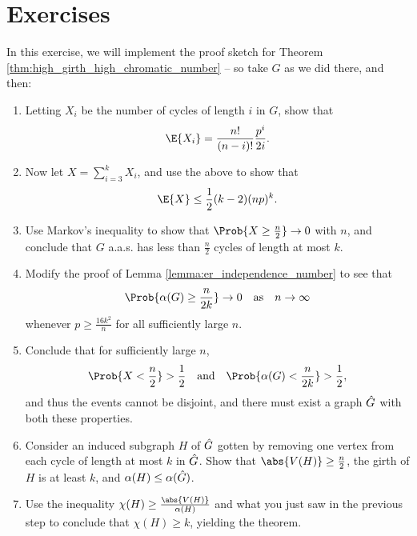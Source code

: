 \documentclass[nobib]{tufte-handout}
\begin{document}
\section{Exercises}

\begin{xca}
  In this exercise, we will implement the proof sketch for Theorem \ref{thm:high_girth_high_chromatic_number} -- so take $G$ as we did there, and then:

  \begin{enumerate}[label=\alph*)]
    \item Letting $X_i$ be the number of cycles of length $i$ in $G$, show that
    $$\E{X_i} = \frac{n!}{(n-i)!}\frac{p^i}{2i}.$$
    \item Now let $X = \sum_{i=3}^k X_i$, and use the above to show that
    $$\E{X} \leq \frac{1}{2}(k-2)(np)^k.$$
    \item Use Markov's inequality to show that $\Prob{X \geq \frac{n}{2}} \to 0$ with $n$, and conclude that $G$ a.a.s. has less than $\frac{n}{2}$ cycles of length at most $k$.
    \item Modify the proof of Lemma \ref{lemma:er_independence_number} to see that
    $$\Prob{\alpha(G) \geq \frac{n}{2k}} \to 0 \quad \text{as} \quad n \to \infty$$
    whenever $p \geq \frac{16k^2}{n}$ for all sufficiently large $n$.
    \item Conclude that for sufficiently large $n$,
    $$\Prob{X < \frac{n}{2}} > \frac{1}{2}\quad\text{and}\quad\Prob{\alpha(G) < \frac{n}{2k}} > \frac{1}{2},$$
    and thus the events cannot be disjoint, and there must exist a graph $\Hat G$ with both these properties.
    \item Consider an induced subgraph $H$ of $\Hat G$ gotten by removing one vertex from each cycle of length at most $k$ in $\Hat G$. Show that $\abs{V(H)} \geq \frac{n}{2}$, the girth of $H$ is at least $k$, and $\alpha(H) \leq \alpha(\Hat G)$.
    \item Use the inequality $\chi(H) \geq \frac{\abs{V(H)}}{\alpha(H)}$ and what you just saw in the previous step to conclude that $\chi(H) \geq k$, yielding the theorem.
  \end{enumerate}
\end{xca}


%
%
\end{document}
